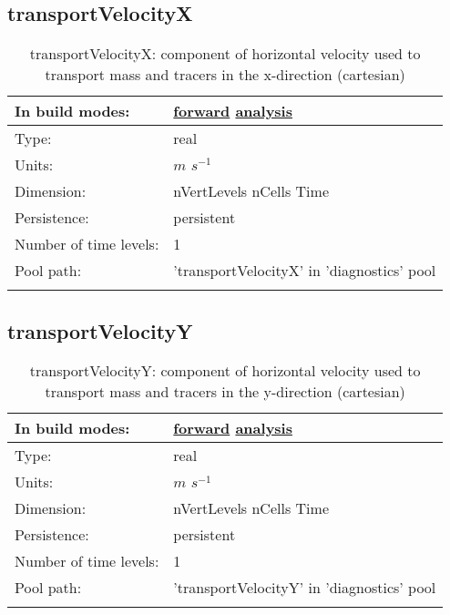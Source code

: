 \subsection[transportVelocityX]{transportVelocityX}
\label{subsec:var_sec_diagnostics_transportVelocityX}
\begin{center}
\begin{longtable}{| p{2.0in} | p{4.0in} |}
        \hline 
        In build modes: & \hyperref[subsec:forward_var_tab_diagnostics]{forward} \hyperref[subsec:analysis_var_tab_diagnostics]{analysis} \\
        \hline 
        Type: & real \\
        \hline 
        Units: & $m$ $s^{-1}$ \\
        \hline 
        Dimension: & nVertLevels nCells Time \\
        \hline 
        Persistence: & persistent \\
        \hline 
        Number of time levels: & 1 \\
        \hline 
            Pool path: & 'transportVelocityX' in 'diagnostics' pool
 \\
		 \hline 
    \caption{transportVelocityX: component of horizontal velocity used to transport mass and tracers in the x-direction (cartesian)}
\end{longtable}
\end{center}
\subsection[transportVelocityY]{transportVelocityY}
\label{subsec:var_sec_diagnostics_transportVelocityY}
\begin{center}
\begin{longtable}{| p{2.0in} | p{4.0in} |}
        \hline 
        In build modes: & \hyperref[subsec:forward_var_tab_diagnostics]{forward} \hyperref[subsec:analysis_var_tab_diagnostics]{analysis} \\
        \hline 
        Type: & real \\
        \hline 
        Units: & $m$ $s^{-1}$ \\
        \hline 
        Dimension: & nVertLevels nCells Time \\
        \hline 
        Persistence: & persistent \\
        \hline 
        Number of time levels: & 1 \\
        \hline 
            Pool path: & 'transportVelocityY' in 'diagnostics' pool
 \\
		 \hline 
    \caption{transportVelocityY: component of horizontal velocity used to transport mass and tracers in the y-direction (cartesian)}
\end{longtable}
\end{center}
